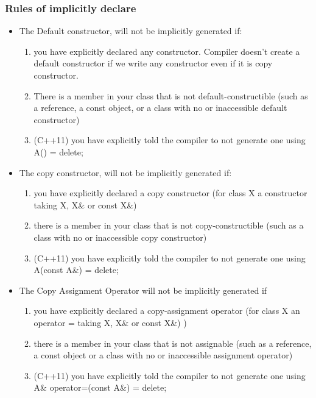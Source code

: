 \documentclass[a4paper,11pt,twoside]{book}
\begin{document}
\subsubsection{Rules of implicitly declare }
\begin{itemize}
	\item The Default constructor, will not be implicitly generated if:
	
		\begin{enumerate}
			\item you have explicitly declared any constructor.  Compiler doesn't create a default constructor if we write any constructor even if it is copy constructor.
		
			\item There is a member in your class that is not default-constructible (such as a reference, a const object, or a class with no or inaccessible default constructor)
		
			\item (C++11) you have explicitly told the compiler to not generate one using A() = delete;
		\end{enumerate}

	\item The copy constructor, will not be implicitly generated if:
		\begin{enumerate}
			\item you have explicitly declared a copy constructor (for class X a constructor taking X, X\& or const X\&)
			
			\item there is a member in your class that is not copy-constructible (such as a class with no or inaccessible copy constructor)
			
			\item (C++11) you have explicitly told the compiler to not generate one using A(const A\&) = delete;
		\end{enumerate}


	\item The Copy Assignment Operator will not be implicitly generated if
		\begin{enumerate}
		\item you have explicitly declared a copy-assignment operator (for class X an operator = taking X, X\& or const X\&) )
		\item there is a member in your class that is not assignable (such as a reference, a const object or a class with no or inaccessible assignment operator)
		\item (C++11) you have explicitly told the compiler to not generate one using A\& operator=(const A\&) = delete;
		\end{enumerate}
	

\end{itemize}
\end{document}
